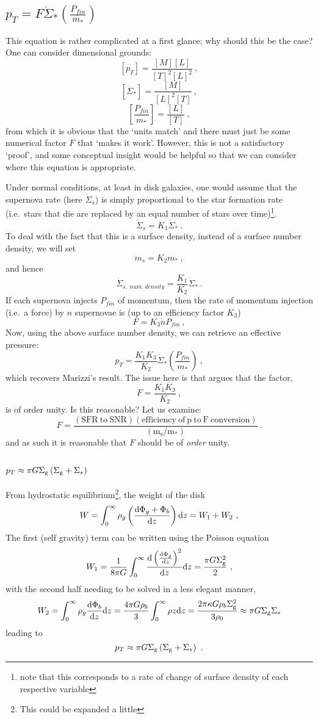\subsection{$p_T = F \dot{\Sigma}_*\left(\frac{P_{fin}}{m_*}\right)$}\label{app:pT}

This equation is rather complicated at a first glance; why should this
be the case? One can consider dimensional grounds:
\[
    [p_T] = \frac{[M][L]}{[T]^2[L]^2}~,
\]
\[
    [\dot{\Sigma}_*] = \frac{[M]}{[L]^2[T]}~,
\]
\[
    \left[\frac{P_{fin}}{m_*}\right] = \frac{[L]}{[T]}~,
\]
from which it is obvious that the `units match' and there must just be
some numerical factor \(F\) that `makes it work'. However, this is not a
satisfactory `proof', and some conceptual insight would be helpful so
that we can consider where this equation is appropriate.

Under normal conditions, at least in disk galaxies, one would assume
that the supernova rate (here \(\dot{\Sigma}_s\)) is simply proportional
to the star formation rate (i.e.~stars that die are replaced by an equal
number of stars over time)\footnote{note that this corresponds to a rate
of change of surface density of each respective variable}.
\[
    \dot{\Sigma}_s = K_1 \dot{\Sigma}_*~.
\]
To deal with the fact that this is a surface density, instead of a
surface number density, we will set
\[
    m_s = K_2 m_*~,
\]
and hence
\[
    \dot{\Sigma}_{s, ~num. ~density} = \frac{K_1}{K_2} \dot{\Sigma}_*~.
\]
If each supernova injects \(P_{fin}\) of momentum, then the rate of
momentum injection (i.e.~a force) by \(n\) supernovae is (up to an
efficiency factor \(K_3\))
\[
    F = K_3\dot{n}P_{fin}~,
\]
Now, using the above surface number density, we can retrieve an effective
pressure:
\[
    p_T = \frac{K_1 K_3}{K_2} \dot{\Sigma}_* \left(\frac{P_{fin}}{m_*}\right)~,
\]
which recovers Marizzi's result. The issue here is that \citet{martizzi_supernova_2016}
argues that the factor,
\[
    F = \frac{K_1 K_3}{K_2}~,
\]
is of order unity. Is this reasonable? Let us examine:
\[
    F = \frac{(\mathrm{SFR ~to ~SNR}) (\mathrm{efficiency ~of ~p ~to ~F ~conversion})}{(\mathrm{m_s/m_*})}~.
\]
and as such it is reasonable that $F$ should be of \emph{order} unity.


\subsection{$p_T \approx \pi G \Sigma_\mathrm{g} \left(\Sigma_\mathrm{g} + \Sigma_*\right)$}
\label{app:pH}

From hydrostatic equilibrium\footnote{This could be expanded a little}, the weight of the disk
$$
	W = \int^\infty_0 \rho_g \left(\frac{\mathrm{d}\Phi_g + \Phi_b}{\mathrm{d}z}\right) \mathrm{d}z = W_1 + W_2~,
$$
The first (self gravity) term can be written using the Poisson equation
$$
	W_1 = \frac{1}{8\pi G}\int^\infty_0 \frac{\mathrm{d}\left(\frac{\mathrm{d}\Phi_g}{\mathrm{d}z}\right)^2}{\mathrm{d}z} \mathrm{d} z = \frac{\pi G \Sigma_\mathrm{g}^2}{2}~,
$$
with the second half needing to be solved in a less elegant manner,
$$
	W_2 = \int^\infty_0 \rho_g \frac{\mathrm{d}\Phi_b}{\mathrm{d}z}\mathrm{d}z = \frac{4\pi G \rho_b}{3} \int^\infty_0 \rho z \mathrm{d}z = \frac{2 \pi \kappa G \rho_b \Sigma_\mathrm{g}^2}{3 \rho_0} \approx \pi G \Sigma_\mathrm{g} \Sigma_*
$$
leading to
$$
	p_T \approx \pi G \Sigma_\mathrm{g}\left(\Sigma_\mathrm{g} + \Sigma_*\right)~.
$$


